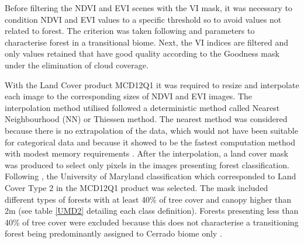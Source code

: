 Before filtering the NDVI and EVI scenes with the VI mask, it was necessary to condition NDVI and EVI values to a specific threshold so to avoid values not related to forest. The criterion was taken following \citet{geerken_2009} and \citet{bayma_sano_2015} parameters to characterise forest in a transitional biome. Next, the VI indices are filtered and only values retained that have good quality according to the Goodness mask under the elimination of cloud coverage. 

With the Land Cover product MCD12Q1 it was required to resize and interpolate each image to the corresponding sizes of NDVI and EVI images. The interpolation method utilised followed a deterministic method called Nearest Neighbourhood (NN) or Thiessen method. The nearest method was considered because there is no extrapolation of the data, which would not have been suitable for categorical data and because it showed to be the fastest computation method with modest memory requirements \citep{ SLUITER_2009, matlab_2017}. After the interpolation, a land cover mask was produced to select only pixels in the images presenting forest classification. Following \citet{sulla2_2018}, the University of Maryland classification which corresponded to Land Cover Type 2 in the MCD12Q1 product was selected. The mask included different types of forests with at least 40\% of tree cover and canopy higher than 2m (see table \ref{UMD2} detailing each class definition). Forests presenting less than 40\% of tree cover were excluded because this does not characterise a transitioning forest being predominantly assigned to Cerrado biome only \citep{bayma_sano_2015}.  

